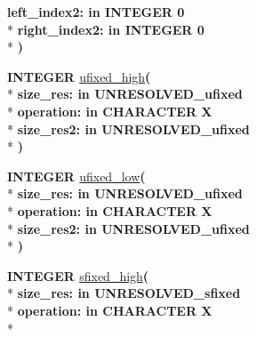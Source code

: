\begin{DoxyCompactItemize}
{\bfseries \textcolor{vhdlchar}{left\+\_\+index2\+: }\textcolor{stringliteral}{in }\textcolor{vhdlchar}{I\+N\+T\+E\+G\+E\+R   0}}\\*
{\bfseries \textcolor{vhdlchar}{right\+\_\+index2\+: }\textcolor{stringliteral}{in }\textcolor{vhdlchar}{I\+N\+T\+E\+G\+E\+R   0}}\\*
{\bfseries  )} 
\item 
{\bfseries {\bfseries \textcolor{comment}{I\+N\+T\+E\+G\+E\+R}\textcolor{vhdlchar}{ }}} \hyperlink{classfixed__pkg_a62041ee415c981b256e2b111fa8e2576}{ufixed\+\_\+high}{\bfseries  ( }\\*
{\bfseries \textcolor{vhdlchar}{size\+\_\+res\+: }\textcolor{stringliteral}{in }\textcolor{vhdlchar}{U\+N\+R\+E\+S\+O\+L\+V\+E\+D\+\_\+ufixed}}\\*
{\bfseries \textcolor{vhdlchar}{operation\+: }\textcolor{stringliteral}{in }\textcolor{vhdlchar}{C\+H\+A\+R\+A\+C\+T\+E\+R   \textquotesingle{}\+X\textquotesingle{}}}\\*
{\bfseries \textcolor{vhdlchar}{size\+\_\+res2\+: }\textcolor{stringliteral}{in }\textcolor{vhdlchar}{U\+N\+R\+E\+S\+O\+L\+V\+E\+D\+\_\+ufixed}}\\*
{\bfseries  )} 
\item 
{\bfseries {\bfseries \textcolor{comment}{I\+N\+T\+E\+G\+E\+R}\textcolor{vhdlchar}{ }}} \hyperlink{classfixed__pkg_a61464bf9312d1c70133d4f048e446dd7}{ufixed\+\_\+low}{\bfseries  ( }\\*
{\bfseries \textcolor{vhdlchar}{size\+\_\+res\+: }\textcolor{stringliteral}{in }\textcolor{vhdlchar}{U\+N\+R\+E\+S\+O\+L\+V\+E\+D\+\_\+ufixed}}\\*
{\bfseries \textcolor{vhdlchar}{operation\+: }\textcolor{stringliteral}{in }\textcolor{vhdlchar}{C\+H\+A\+R\+A\+C\+T\+E\+R   \textquotesingle{}\+X\textquotesingle{}}}\\*
{\bfseries \textcolor{vhdlchar}{size\+\_\+res2\+: }\textcolor{stringliteral}{in }\textcolor{vhdlchar}{U\+N\+R\+E\+S\+O\+L\+V\+E\+D\+\_\+ufixed}}\\*
{\bfseries  )} 
\item 
{\bfseries {\bfseries \textcolor{comment}{I\+N\+T\+E\+G\+E\+R}\textcolor{vhdlchar}{ }}} \hyperlink{classfixed__pkg_a2eb78ffde3bf4ab8b16c47a3535d07ea}{sfixed\+\_\+high}{\bfseries  ( }\\*
{\bfseries \textcolor{vhdlchar}{size\+\_\+res\+: }\textcolor{stringliteral}{in }\textcolor{vhdlchar}{U\+N\+R\+E\+S\+O\+L\+V\+E\+D\+\_\+sfixed}}\\*
{\bfseries \textcolor{vhdlchar}{operation\+: }\textcolor{stringliteral}{in }\textcolor{vhdlchar}{C\+H\+A\+R\+A\+C\+T\+E\+R   \textquotesingle{}\+X\textquotesingle{}}}\\*

\end{DoxyCompactItemize}
